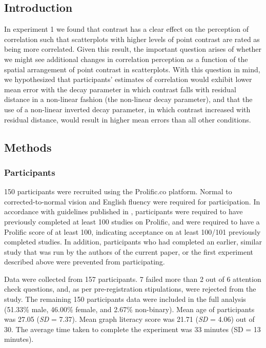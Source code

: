 \documentclass[preprint, 3p,
authoryear]{elsarticle} %
\begin{document}
\hypertarget{introduction-2}{%
\subsection{Introduction}\label{introduction-2}}

In experiment 1 we found that contrast has a clear effect on the
perception of correlation such that scatterplots with higher levels of
point contrast are rated as being more correlated. Given this result,
the important question arises of whether we might see additional changes
in correlation perception as a function of the spatial arrangement of
point contrast in scatterplots. With this question in mind, we
hypothesized that participants' estimates of correlation would exhibit
lower mean error with the decay parameter in which contrast falls with
residual distance in a non-linear fashion (the non-linear decay
parameter), and that the use of a non-linear inverted decay parameter,
in which contrast increased with residual distance, would result in
higher mean errors than all other conditions.

\hypertarget{methods}{%
\subsection{Methods}\label{methods}}

\hypertarget{participants-1}{%
\subsubsection{Participants}\label{participants-1}}

150 participants were recruited using the Prolific.co platform. Normal
to corrected-to-normal vision and English fluency were required for
participation. In accordance with guidelines published in
\citealp{peer_2021}, participants were required to have previously
completed at least 100 studies on Prolific, and were required to have a
Prolific score of at least 100, indicating acceptance on at least
100/101 previously completed studies. In addition, participants who had
completed an earlier, similar study that was run by the authors of the
current paper, or the first experiment described above were prevented
from participating.

Data were collected from 157 participants. 7 failed more than 2 out of 6
attention check questions, and, as per pre-registration stipulations,
were rejected from the study. The remaining 150 participants data were
included in the full analysis (51.33\% male, 46.00\% female, and 2.67\%
non-binary). Mean age of participants was 27.05 (\emph{SD} = 7.37). Mean
graph literacy score was 21.71 (\emph{SD} = 4.06) out of 30. The average
time taken to complete the experiment was 33 minutes (SD = 13 minutes).
\end{document}

